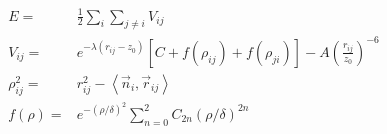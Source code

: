 \documentclass[12pt]{article}
\begin{document}
\begin{eqnarray*}
  E = & \frac{1}{2} \sum_i \sum_{j \neq i} V_{ij} \\
  V_{ij} = & e^{-\lambda(r_{ij} -z_0)} \left[ C + f(\rho_{ij}) + f(\rho_{ji}) \right] - A \left( \frac{r_{ij}}{z_0}\right)^{-6}\\
  \rho_{ij}^2 = & r_{ij}^2 - \left<\vec{n}_i,\vec{r}_{ij}\right> \\
  f(\rho) = &  e^{-(\rho/\delta)^2} \sum_{n=0}^2 C_{2n} \left( \rho/\delta \right)^{2n}
\end{eqnarray*}
\end{document}
